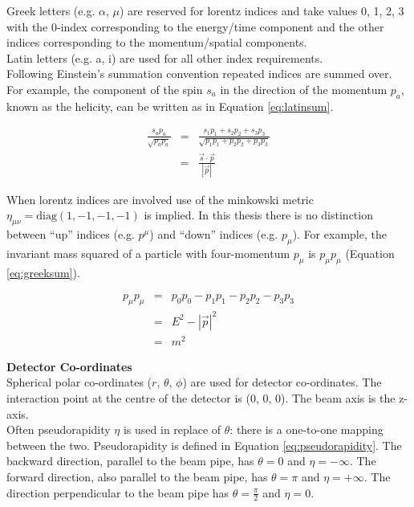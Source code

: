 Greek letters (e.g. $\alpha$, $\mu$) are reserved for lorentz indices and take
values 0, 1, 2, 3 with the 0-index corresponding to the energy/time component
and the other indices corresponding to the momentum/spatial components. \\

Latin letters (e.g. a, i) are used for all other index requirements. \\

Following Einstein's summation convention repeated indices are summed over. For 
example, the component of the spin $s_{a}$ in the direction of the momentum 
$p_{a}$, known as the helicity, can be written as in Equation \ref{eq:latinsum}.

\begin{eqnarray}
\frac{s_{a}p_{a}}{\sqrt{p_{a}p_{a}}} &=& \frac{s_{1}p_{1} + s_{2}p_{2} + s_{3}p_{3}}
{\sqrt{p_{1}p_{1} + p_{2}p_{2} + p_{3}p_{3}}} \nonumber \\
&=& \frac{\vec{s}\cdot\vec{p}}{|\vec{p}|}
\label{eq:latinsum}
\end{eqnarray}

When lorentz indices are involved use of the minkowski metric $\eta_{\mu\nu} =
\mathrm{diag}(1, -1, -1, -1)$ is implied. In this thesis there is no distinction 
between ``up'' indices (e.g. $p^{\mu}$) and ``down'' indices (e.g. $p_{\mu}$). 
For example, the invariant mass squared of a particle with four-momentum 
$p_{\mu}$ is $p_{\mu}p_{\mu}$ (Equation \ref{eq:greeksum}). 

\begin{eqnarray}
p_{\mu}p_{\mu} &=& p_{0}p_{0} - p_{1}p_{1} - p_{2}p_{2} - p_{3}p_{3} \nonumber
\\
&=& E^{2} - |\vec{p}|^{2} \nonumber \\
&=& m^{2}
\label{eq:greeksum}
\end{eqnarray}

{\bf Detector Co-ordinates} \\

Spherical polar co-ordinates ($r$, $\theta$, $\phi$) are used for detector
co-ordinates. The interaction point at the centre of the detector is (0, 0, 0).
The beam axis is the z-axis. \\

Often pseudorapidity $\eta$ is used in replace of $\theta$: there is a 
one-to-one mapping between the two. Pseudorapidity is defined in Equation 
\ref{eq:pseudorapidity}. The backward direction, parallel to the beam pipe, has 
$\theta = 0$ and $\eta = -\infty$. The forward direction, also parallel to the
beam pipe, has $\theta = \pi$ and $\eta = +\infty$. The direction perpendicular 
to the beam pipe has $\theta = \frac{\pi}{2}$ and $\eta = 0$. 

